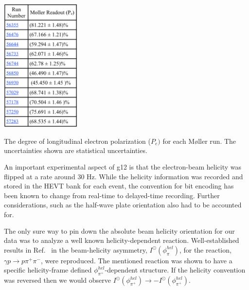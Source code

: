 \begin{table}[htpb]
\begin{center}
 \includegraphics[width=0.3\textwidth]{figures/calib/pol/moltable.eps}
  \caption{The degree of longitudinal electron polarization ($P_e)$ for each M{\o}ller run. The uncertainties shown are statistical uncertainties. }
  \label{moltable}
  \end{center}
\end{table}

An important experimental aspect of g12 is that the electron-beam helicity was flipped at a rate around 30 Hz. While the helicity information was recorded and stored in the HEVT bank for each event, the convention for bit encoding has been known to change from real-time to delayed-time recording. Further considerations, such as the half-wave plate orientation also had to be accounted for.

The only sure way to pin down the absolute beam helicity orientation for our data was to analyze a well known helicity-dependent reaction. Well-established results in Ref.~\cite{Io} in the beam-helicity asymmetry, $I^\odot(\phi^{hel}_\pi)$, for the reaction, $\gamma p \to p \pi^+ \pi^-$, were reproduced.  The mentioned reaction was shown to have a specific helicity-frame defined $\phi^{hel}_{\pi^+}$-dependent structure.  If the helicity convention was reversed then we would observe $I^\odot(\phi^{hel}_{\pi^+}) \to -I^\odot(\phi^{hel}_{\pi^+})$.

